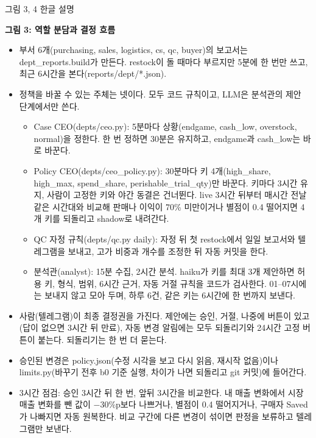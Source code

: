 \documentclass[10pt]{article}
\newcommand{\kpage}[2]{\noindent{\hangulfont\LARGE\bfseries\color{own}#1}\hfill{\hangulfont\small\color{kit}#2}\par
  \vspace{1mm}{\color{own}\rule{\linewidth}{1.2pt}}\par\vspace{3mm}}
\newcommand{\ksec}[2][own]{\par\needspace{8\baselineskip}\vspace{3mm}\noindent\colorbox{#1}{\parbox{\dimexpr\linewidth-2\fboxsep}{\color{white}\bfseries\large #2}}\par\vspace{2mm}}
\begin{document}
\newpage
\hangulfont\small\linespread{1.25}\selectfont\setlength{\parskip}{3pt}
\kpage{Roles and safety}{그림 3, 4 한글 설명}
\ksec{그림 3: 역할 분담과 결정 흐름}
\begin{itemize}
  \item 부서 6개(purchasing, sales, logistics, cs, qc, buyer)의 보고서는 dept\_reports.build가 만든다. restock이 돌 때마다
        부르지만 5분에 한 번만 쓰고, 최근 6시간을 본다(reports/dept/*.json).
  \item 정책을 바꿀 수 있는 주체는 넷이다. 모두 코드 규칙이고, LLM은 분석관의 제안 단계에서만 쓴다.
  \begin{itemize}
    \item Case CEO(depts/ceo.py): 5분마다 상황(endgame, cash\_low, overstock, normal)을 정한다. 한 번 정하면 30분은 유지하고,
          endgame과 cash\_low는 바로 바꾼다.
    \item Policy CEO(depts/ceo\_policy.py): 30분마다 키 4개(high\_share, high\_max, spend\_share, perishable\_trial\_qty)만 바꾼다.
          키마다 3시간 유지, 사람이 고정한 키와 야간 동결은 건너뛴다. live 3시간 뒤부터 매시간 전날 같은 시간대와 비교해
          판매나 이익이 70\% 미만이거나 별점이 0.4 떨어지면 4개 키를 되돌리고 shadow로 내려간다.
    \item QC 자정 규칙(depts/qc.py daily): 자정 뒤 첫 restock에서 일일 보고서와 텔레그램을 보내고, 고가 비중과 개수를
          조정한 뒤 자동 커밋을 한다.
    \item 분석관(analyst): 15분 수집, 2시간 분석. haiku가 키를 최대 3개 제안하면 허용 키, 형식, 범위, 6시간 근거, 자동 거절
          규칙을 코드가 검사한다. 01--07시에는 보내지 않고 모아 두며, 하루 6건, 같은 키는 6시간에 한 번까지 보낸다.
  \end{itemize}
  \item 사람(텔레그램)이 최종 결정권을 가진다. 제안에는 승인, 거절, 나중에 버튼이 있고(답이 없으면 3시간 뒤 만료),
        자동 변경 알림에는 모두 되돌리기와 24시간 고정 버튼이 붙는다. 되돌리기는 한 번 더 묻는다.
  \item 승인된 변경은 policy.json(수정 시각을 보고 다시 읽음, 재시작 없음)이나 limits.py(바꾸기 전후 b0 기준 실행, 차이가
        나면 되돌리고 git 커밋)에 들어간다.
  \item 3시간 점검: 승인 3시간 뒤 한 번, 앞뒤 3시간을 비교한다. 내 매출 변화에서 시장 매출 변화를 뺀 값이 $-$30\%p보다
        나쁘거나, 별점이 0.4 떨어지거나, 구매자 Saved가 나빠지면 자동 원복한다. 비교 구간에 다른 변경이 섞이면 판정을
        보류하고 텔레그램만 보낸다.
\end{itemize}
\end{document}
